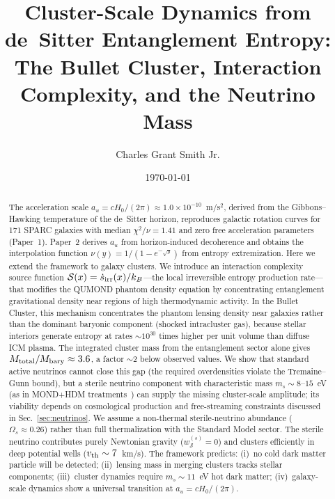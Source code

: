 \documentclass[aps,prd,twocolumn,superscriptaddress,nofootinbib]{revtex4-2}
\newcommand{\au}{a_u}
\newcommand{\wS}{w_{\mathcal{S}}}
\newcommand{\Ssrc}{\mathcal{S}}
\begin{document}
\title{Cluster-Scale Dynamics from de~Sitter Entanglement Entropy:\\
The Bullet Cluster, Interaction Complexity, and the Neutrino Mass}

\author{Charles Grant Smith Jr.}

\date{\today}

\begin{abstract}
The acceleration scale $\au=cH_0/(2\pi)\approx 1.0\times 10^{-10}$~m/s$^2$, derived from the Gibbons--Hawking temperature of the de~Sitter horizon, reproduces galactic rotation curves for 171 SPARC galaxies with median $\chi^2/\nu=1.41$ and zero free acceleration parameters (Paper~1). Paper~2 derives $\au$ from horizon-induced decoherence and obtains the interpolation function $\nu(y)=1/(1-e^{-\sqrt{y}})$ from entropy extremization. Here we extend the framework to galaxy clusters. We introduce an interaction complexity source function $\Ssrc(x)=\dot{s}_{\rm irr}(x)/k_B$---the local irreversible entropy production rate---that modifies the QUMOND phantom density equation by concentrating entanglement gravitational density near regions of high thermodynamic activity. In the Bullet Cluster, this mechanism concentrates the phantom lensing density near galaxies rather than the dominant baryonic component (shocked intracluster gas), because stellar interiors generate entropy at rates $\sim 10^{30}$ times higher per unit volume than diffuse ICM plasma. The integrated cluster mass from the entanglement sector alone gives $M_{\rm total}/M_{\rm bary}\approx 3.6$, a factor $\sim 2$ below observed values. We show that standard active neutrinos cannot close this gap (the required overdensities violate the Tremaine--Gunn bound), but a sterile neutrino component with characteristic mass $m_s\sim 8$--$15$~eV (as in MOND+HDM treatments~\cite{Angus2009,Haslbauer2020}) can supply the missing cluster-scale amplitude; its viability depends on cosmological production and free-streaming constraints discussed in Sec.~\ref{sec:neutrinos}. We assume a non-thermal sterile-neutrino abundance ($\Omega_s\approx 0.26$) rather than full thermalization with the Standard Model sector. The sterile neutrino contributes purely Newtonian gravity ($\wS^{(s)}=0$) and clusters efficiently in deep potential wells ($v_{\rm th}\sim 7$~km/s). The framework predicts: (i)~no cold dark matter particle will be detected; (ii)~lensing mass in merging clusters tracks stellar components; (iii)~cluster dynamics require $m_s\sim 11$~eV hot dark matter; (iv)~galaxy-scale dynamics show a universal transition at $\au=cH_0/(2\pi)$.
\end{abstract}
\end{document}
